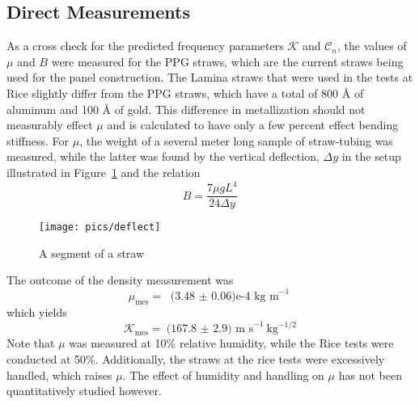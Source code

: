 \documentclass[twoside]{article}
\begin{document}
\begin{multicols}{2}






\section{Direct Measurements}
As a cross check for the predicted frequency parameters $\mathcal{K}$ and $\mathcal{C}_n$, the values of $\mu$ and $B$ were measured for the PPG straws, which are the current straws being used for the panel construction. The Lamina straws that were used in the tests at Rice slightly differ from the PPG straws, which have a total of 800 \r{A} of aluminum and 100 \r{A} of gold. This difference in metallization should not measurably effect $\mu$ and is calculated to have only a few percent effect bending stiffness.  For $\mu$, the weight of a several meter long sample of straw-tubing was measured, while the latter was found by the vertical deflection, $\Delta y$ in the setup illustrated in Figure~\ref{fig:deflect} and the relation
\begin{equation}
B = \frac{7  \mu g L^4}{24 \Delta y}
\end{equation}
\begin{figure}[H]
	\texttt{[image: pics/deflect]}
	\caption{A segment of a straw}
	\label{fig:deflect}
\end{figure}
The outcome  of the density measurement was
\begin{equation}
	\mu_\text{mes} = \text{  (3.48 $\pm$ 0.06)e-4  kg m}^{-1}
\label{eq:mesmu}
\end{equation}
which yields
\begin{equation}
\boxed{
\mathcal{K}_\text{mes}  = \text{(167.8 $\pm$ 2.9) m s}^{-1} \text{kg}^{-1/2}
}
\end{equation}
Note that $\mu$ was measured at 10\% relative humidity, while the Rice tests were conducted at 50\%. Additionally, the straws at the rice tests were excessively handled, which raises $\mu$.  The effect of humidity and handling on $\mu$ has not been quantitatively studied however.



\end{multicols}
\end{document}
